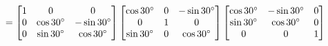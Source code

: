 \documentclass[preview]{standalone}
\begin{document}
\begin{align*}
\special{dvisvgm:raw <g id='unique000'>}=  \special{dvisvgm:raw </g>}\special{dvisvgm:raw <g id='unique001'>}\begin{bmatrix} 1 & 0 & 0 \\ 0 & \cos 30^\circ & -\sin 30^\circ \\ 0 & \sin 30^\circ & \cos 30^\circ \end{bmatrix} \special{dvisvgm:raw </g>}\special{dvisvgm:raw <g id='unique002'>}\begin{bmatrix} \cos 30^\circ & 0 & -\sin 30^\circ \\ 0 & 1 & 0 \\ \sin 30^\circ & 0 & \cos 30^\circ \end{bmatrix} \special{dvisvgm:raw </g>}\special{dvisvgm:raw <g id='unique003'>}\begin{bmatrix} \cos 30^\circ & -\sin 30^\circ & 0 \\ \sin 30^\circ & \cos 30^\circ & 0 \\ 0 & 0 & 1 \end{bmatrix}\special{dvisvgm:raw </g>}
\end{align*}
\end{document}
